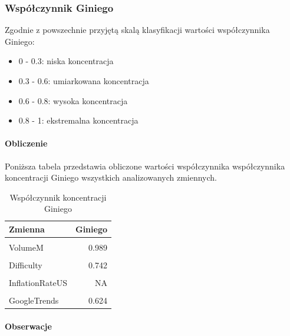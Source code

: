 \documentclass[
  11pt,
]{article}
\providecommand{\tightlist}{%
  \setlength{\itemsep}{0pt}\setlength{\parskip}{0pt}}
\begin{document}
\pagebreak

\subsubsection{Współczynnik Giniego}\label{wspuxf3ux142czynnik-giniego}

Zgodnie z powszechnie przyjętą skalą klasyfikacji wartości współczynnika
Giniego:

\begin{itemize}
\tightlist
\item
  0 - 0.3: niska koncentracja
\item
  0.3 - 0.6: umiarkowana koncentracja
\item
  0.6 - 0.8: wysoka koncentracja
\item
  0.8 - 1: ekstremalna koncentracja
\end{itemize}

\paragraph{\texorpdfstring{Obliczenie
\newline}{Obliczenie }}\label{obliczenie-5}

Poniższa tabela przedstawia obliczone wartości współczynnika
współczynnika koncentracji Giniego wszystkich analizowanych zmiennych.

\begin{table}[!h]
\centering
\caption{\label{tab:unnamed-chunk-9}Współczynnik koncentracji Giniego}
\centering
\begin{tabular}[t]{lr}
\toprule
Zmienna & Giniego\\
\midrule
\cellcolor{gray!10}{Price} & \cellcolor{gray!10}{0.708}\\
VolumeM & 0.989\\
\cellcolor{gray!10}{USAvgKWHPrice} & \cellcolor{gray!10}{0.055}\\
Difficulty & 0.742\\
\cellcolor{gray!10}{BTCCirculation} & \cellcolor{gray!10}{0.156}\\
\addlinespace
InflationRateUS & NA\\
\cellcolor{gray!10}{HasMuskMentioned} & \cellcolor{gray!10}{0.922}\\
GoogleTrends & 0.624\\
\bottomrule
\end{tabular}
\end{table}

\paragraph{Obserwacje}\label{obserwacje-8}
\end{document}
